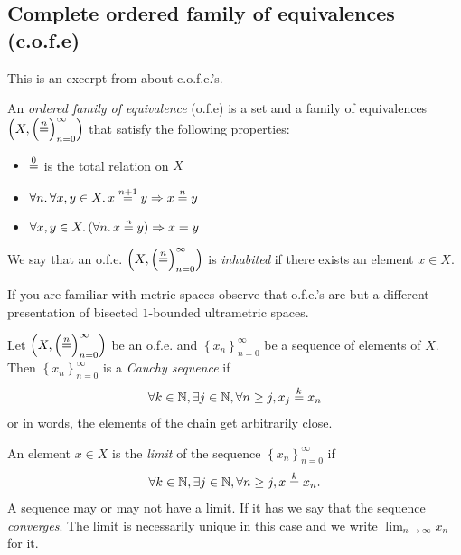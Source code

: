 \documentclass[format=acmsmall, review=true, screen=true]{acmart}
\newcommand{\nequal}[1][n]{\stackrel{\tiny{#1}}{=}}
\newcommand{\nats}{\mathbb{N}}
\begin{document}
\subsection{Complete ordered family of equivalences (c.o.f.e)}
\newcommand{\seq}[1]{\ensuremath{\left\{#1_n\right\}_{n=0}^{\infty}}}
\newcommand{\seqn}[1]{\ensuremath{\left(#1\right)_{n=0}^{\infty}}}
\newcommand{\NN}{\ensuremath{\mathbb{N}}}
\newcommand{\Ul}{\ensuremath{\mathcal{U}}}
\newcommand{\Later}{\ensuremath{\blacktriangleright}}
\newcommand{\op}[1]{\ensuremath{#1^{\text{op}}}}
\newcommand{\comp}{\circ}
\newcommand{\iso}{\cong}
\renewcommand{\hom}[3]{#1(#2,#3)}

\label{app:cofe}
This is an excerpt from \citet{Birkedal:tutorial-notes} about c.o.f.e.'s.
\begin{definition}[o.f.e.] An \emph{ordered family of equivalence} (o.f.e) is a
  set and a family of equivalences $\left(X, \left( \nequal \right)_{n=0}^\infty
  \right)$ that satisfy the following properties: 
  \begin{itemize}
  \item $\nequal[0]$ is the total relation on $X$
  \item $\forall n \ldotp \forall x,y \in X \ldotp x \nequal[n+1] y \Rightarrow
    x \nequal y$
  \item $\forall x,y \in X \ldotp (\forall n\ldotp x \nequal y) \Rightarrow x = y$
  \end{itemize}
  We say that an o.f.e. $\left(X, \seqn{\nequal[n]}\right)$ is \emph{inhabited} if there
  exists an element $x \in X$.
\end{definition}

If you are familiar with metric spaces observe that o.f.e.'s are but a different
presentation of bisected $1$-bounded ultrametric spaces.

\begin{definition}
  \label{def:cauchy-sequence}
  Let $\left(X, \seqn{\nequal} \right)$ be an o.f.e. and $\seq{x}$ be a sequence of
  elements of $X$. Then $\seq{x}$ is a \emph{Cauchy sequence} if
  \begin{align*}
    \forall k \in \nats, \exists j \in \nats, \forall n \geq j, x_j \nequal[k] x_n
  \end{align*}
  or in words, the elements of the chain get arbitrarily close.

  An element $x \in X$ is the \emph{limit} of the sequence $\seq{x}$ if
  \begin{align*}
    \forall k \in \nats, \exists j \in \nats, \forall n \geq j, x \nequal[k] x_n.
  \end{align*}
  A sequence may or may not have a limit. If it has we say that the sequence
  \emph{converges}. The limit is necessarily unique in this case
  and we write $\lim_{n\to\infty}x_n$ for it.
\end{definition}
\end{document}
